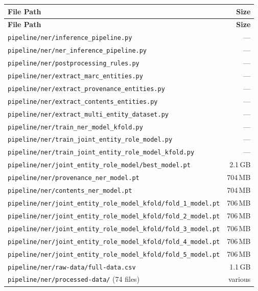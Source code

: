 \documentclass[12pt]{article}
\newcommand{\filepath}[1]{\texttt{\small #1}}
\begin{document}
\begin{longtable}{|p{10cm}|r|}
\hline
\textbf{File Path} & \textbf{Size} \\
\hline
\endfirsthead
\hline
\textbf{File Path} & \textbf{Size} \\
\hline
\endhead
\hline
\endfoot
\filepath{pipeline/ner/inference\_pipeline.py} & --- \\
\hline
\filepath{pipeline/ner/ner\_inference\_pipeline.py} & --- \\
\hline
\filepath{pipeline/ner/postprocessing\_rules.py} & --- \\
\hline
\filepath{pipeline/ner/extract\_marc\_entities.py} & --- \\
\hline
\filepath{pipeline/ner/extract\_provenance\_entities.py} & --- \\
\hline
\filepath{pipeline/ner/extract\_contents\_entities.py} & --- \\
\hline
\filepath{pipeline/ner/extract\_multi\_entity\_dataset.py} & --- \\
\hline
\filepath{pipeline/ner/train\_ner\_model\_kfold.py} & --- \\
\hline
\filepath{pipeline/ner/train\_joint\_entity\_role\_model.py} & --- \\
\hline
\filepath{pipeline/ner/train\_joint\_entity\_role\_model\_kfold.py} & --- \\
\hline
\filepath{pipeline/ner/joint\_entity\_role\_model/best\_model.pt} & 2.1\,GB \\
\hline
\filepath{pipeline/ner/provenance\_ner\_model.pt} & 704\,MB \\
\hline
\filepath{pipeline/ner/contents\_ner\_model.pt} & 704\,MB \\
\hline
\filepath{pipeline/ner/joint\_entity\_role\_model\_kfold/fold\_1\_model.pt} & 706\,MB \\
\hline
\filepath{pipeline/ner/joint\_entity\_role\_model\_kfold/fold\_2\_model.pt} & 706\,MB \\
\hline
\filepath{pipeline/ner/joint\_entity\_role\_model\_kfold/fold\_3\_model.pt} & 706\,MB \\
\hline
\filepath{pipeline/ner/joint\_entity\_role\_model\_kfold/fold\_4\_model.pt} & 706\,MB \\
\hline
\filepath{pipeline/ner/joint\_entity\_role\_model\_kfold/fold\_5\_model.pt} & 706\,MB \\
\hline
\filepath{pipeline/ner/raw-data/full-data.csv} & 1.1\,GB \\
\hline
\filepath{pipeline/ner/processed-data/} (74 files) & various \\
\hline
\end{longtable}
\end{document}

